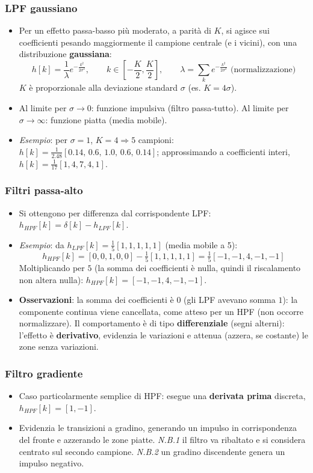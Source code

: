 \documentclass[12pt, a4paper]{article}
\begin{document}
\subsubsection{LPF gaussiano}
\begin{itemize}
    \item Per un effetto passa-basso più moderato, a parità di $K$, si agisce sui coefficienti pesando maggiormente il campione centrale (e i vicini), con una distribuzione \textbf{gaussiana}:
    $$h[k] = \frac{1}{\lambda}e^{-\frac{k^2}{2\sigma^2}}, \qquad k\in\left[-\frac K2,\frac K2\right], \qquad \lambda=\sum_k e^{-\frac{k^2}{2\sigma^2}} \text{ (normalizzazione)}$$
    $K$ è proporzionale alla deviazione standard $\sigma$ (es. $K=4\sigma$).
    \item Al limite per $\sigma\to0$: funzione impulsiva (filtro passa-tutto). Al limite per $\sigma\to\infty$: funzione piatta (media mobile).
    \item \textit{Esempio}: per $\sigma=1$, $K=4\Rightarrow5$ campioni: $h[k]=\frac{1}{2.48}[0.14,\,0.6,\,1.0,\,0.6,\,0.14]$; approssimando a coefficienti interi, $h[k]=\frac{1}{17}[1,4,7,4,1]$.
\end{itemize}

\subsubsection{Filtri passa-alto}
\begin{itemize}
    \item Si ottengono per differenza dal corrispondente LPF: $h_{HPF}[k]=\delta[k]-h_{LPF}[k]$.
    \item \textit{Esempio}: da $h_{LPF}[k]=\frac15[1,1,1,1,1]$ (media mobile a 5):
    $$h_{HPF}[k]=[0,0,1,0,0]-\tfrac15[1,1,1,1,1]=\tfrac15[-1,-1,4,-1,-1]$$
    Moltiplicando per $5$ (la somma dei coefficienti è nulla, quindi il riscalamento non altera nulla): $h_{HPF}[k]=[-1,-1,4,-1,-1]$.
    \item \textbf{Osservazioni}: la somma dei coefficienti è $0$ (gli LPF avevano somma $1$): la componente continua viene cancellata, come atteso per un HPF (non occorre normalizzare). Il comportamento è di tipo \textbf{differenziale} (segni alterni): l'effetto è \textbf{derivativo}, evidenzia le variazioni e attenua (azzera, se costante) le zone senza variazioni.
\end{itemize}

\subsubsection{Filtro gradiente}
\begin{itemize}
    \item Caso particolarmente semplice di HPF: esegue una \textbf{derivata prima} discreta, $h_{HPF}[k]=[1,-1]$.
    \item Evidenzia le transizioni a gradino, generando un impulso in corrispondenza del fronte e azzerando le zone piatte. \textit{N.B.1} il filtro va ribaltato e si considera centrato sul secondo campione. \textit{N.B.2} un gradino discendente genera un impulso negativo.
\end{itemize}
\end{document}
